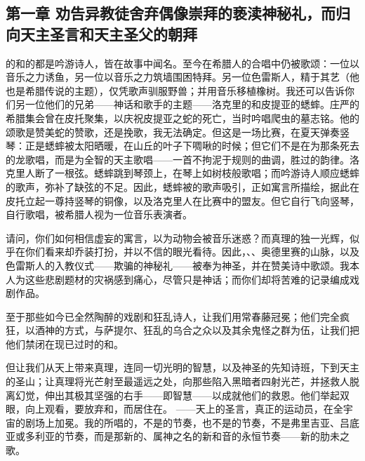 
\subsection{第一章  劝告异教徒舍弃偶像崇拜的亵渎神秘礼，而归向天主圣言和天主圣父的朝拜}

的和的都是吟游诗人，皆在故事中闻名。至今在希腊人的合唱中仍被歌颂：一位以音乐之力诱鱼，另一位以音乐之力筑墙围困特拜。另一位色雷斯人，精于其艺（他也是希腊传说的主题），仅凭歌声驯服野兽；并用音乐移植橡树。我还可以告诉你们另一位他们的兄弟——神话和歌手的主题——洛克里的和皮提亚的蟋蟀。庄严的希腊集会曾在皮托聚集，以庆祝皮提亚之蛇的死亡，当时吟唱爬虫的墓志铭。他的颂歌是赞美蛇的赞歌，还是挽歌，我无法确定。但这是一场比赛，在夏天弹奏竖琴：正是蟋蟀被太阳晒暖，在山丘的叶子下啁啾的时候；但它们不是在为那条死去的龙歌唱，而是为全智的天主歌唱——一首不拘泥于规则的曲调，胜过的韵律。洛克里人断了一根弦。蟋蟀跳到琴颈上，在琴上如树枝般歌唱；而吟游诗人顺应蟋蟀的歌声，弥补了缺弦的不足。因此，蟋蟀被的歌声吸引，正如寓言所描绘，据此在皮托立起一尊持竖琴的铜像，以及洛克里人在比赛中的盟友。但它自行飞向竖琴，自行歌唱，被希腊人视为一位音乐表演者。\par

请问，你们如何相信虚妄的寓言，以为动物会被音乐迷惑？而真理的独一光辉，似乎在你们看来却乔装打扮，并以不信的眼光看待。因此，、、奥德里赛的山脉，以及色雷斯人的入教仪式——欺骗的神秘礼——被奉为神圣，并在赞美诗中歌颂。我本人为这些悲剧题材的灾祸感到痛心，尽管只是神话；而你们却将苦难的记录编成戏剧作品。\par

至于那些如今已全然陶醉的戏剧和狂乱诗人，让我们用常春藤冠冕；他们完全疯狂，以酒神的方式，与萨提尔、狂乱的乌合之众以及其余鬼怪之群为伍，让我们把他们禁闭在现已过时的和。\par

但让我们从天上带来真理，连同一切光明的智慧，以及神圣的先知诗班，下到天主的圣山；让真理将光芒射至最遥远之处，向那些陷入黑暗者四射光芒，并拯救人脱离幻觉，伸出其极其坚强的右手——即智慧——以成就他们的救恩。他们举起双眼，向上观看，要放弃和，而居住在。 ——天上的圣言，真正的运动员，在全宇宙的剧场上加冕。我的所唱的，不是的节奏，也不是的节奏，不是弗里吉亚、吕底亚或多利亚的节奏，而是那新的、属神之名的新和音的永恒节奏——新的肋未之歌。\par

